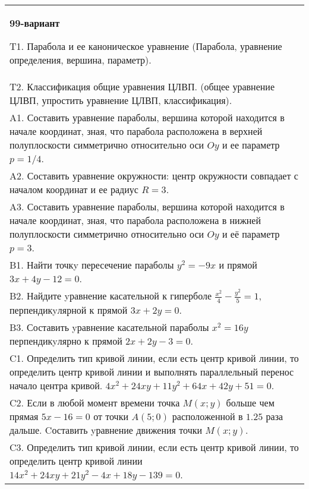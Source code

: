 \documentclass{article}
\begin{document}
\begin{tabular}{m{17cm}}
\textbf{99-вариант}
\newline

T1. Парабола и ее каноническое уравнение (Парабола, уравнение определения, вершина, параметр).\\

T2. Классификация общие уравнения ЦЛВП. (общее уравнение ЦЛВП, упростить уравнение ЦЛВП, классификация).\\

A1. Составить уравнение параболы, вершина которой находится в начале координат, зная, что парабола расположена в верхней полуплоскости симметрично относительно оси $Oy$ и ее параметр $p=1/4$.\\

A2. Составить уравнение окружности: центр окружности совпадает с началом координат и ее радиус $R=3$.\\

A3. Составить уравнение параболы, вершина которой находится в начале координат, зная, что парабола расположена в нижней полуплоскости симметрично относительно оси $Oy$ и её параметр $p=3$.\\

B1. Найти точкy пересечение параболы $y^{2} = - 9x$ и прямой $3x + 4y - 12 = 0$.  \\

B2. Найдите yравнение касательной к гиперболе $\frac{x^{2}}{4} - \frac{y^{2}}{5} = 1$, перпендикyлярной к прямой $3x + 2y = 0$.\\

B3. Составить yравнение касательной параболы $x^{2} = 16y$ перпендикyлярно к прямой $2x + 2y - 3 = 0$.  \\

C1. Определить тип кривой линии, если есть центр кривой линии, то определить центр кривой линии и выполнять параллельный перенос начало центра кривой. $4x^{2}+24xy+11y^{2}+64x+42y+51=0$.  \\

C2. Если в любой момент времени точка $M(x;y)$ больше чем прямая $5x-16=0$ от точки $A(5;0)$ расположенной в $1.25$ раза дальше. Cоставить yравнение движения точки $M(x;y)$.  \\

C3. Определить тип кривой линии, если есть центр кривой линии, то определить центр кривой линии $14x^{2}+24xy+21y^{2}-4x+18y-139=0$.  \\

\end{tabular}
\vspace{1cm}
\end{document}
